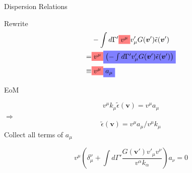 \begin{frame}{Dispersion Relations}



Rewrite
\begin{align*}
    &- \int d\Gamma' \colorbox{red!50}{$v^\mu$} v'_\mu G(\boldsymbol{v}') \tilde \epsilon (\boldsymbol{v}') \\
    =& \colorbox{red!50}{$v^\mu$} \colorbox{blue!50}{$\left(- \int d\Gamma'  v'_\mu G(\boldsymbol{v}') \tilde \epsilon (\boldsymbol{v}') \right)$} \\
    \equiv&   \colorbox{red!50}{$v^\mu$} \colorbox{blue!50}{$a_\mu$}
\end{align*}

\pause

EoM


\begin{equation*}
    v^\mu k_\mu \tilde \epsilon (\boldsymbol{v}) = v^\mu a_\mu
\end{equation*}
\pause
{\centering
$\Longrightarrow$
\begin{equation*}
    \tilde \epsilon (\boldsymbol{v}) = v^\mu a_\mu/v^\mu k_\mu
\end{equation*}
}
Collect all terms of $a_\mu$

\begin{equation*}
    v^\mu \left( \delta_\mu^\nu +  \int d\Gamma' \frac{ G(\boldsymbol{ v}') v'_\mu v^\nu }{ v^\alpha k_\alpha }   \right) a_\nu = 0
\end{equation*}

\end{frame}


